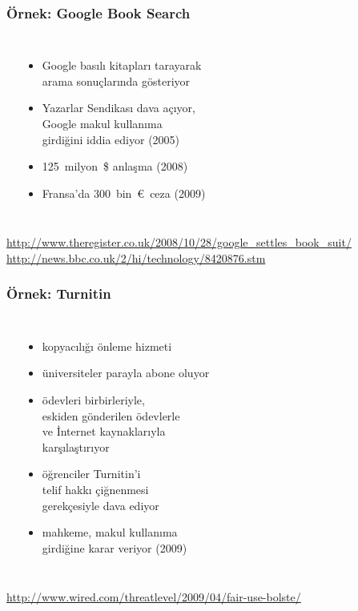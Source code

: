 \documentclass[dvipsnames]{beamer}
\theoremstyle{plain}
\begin{document}
\begin{frame}
  \frametitle{Örnek: Google Book Search}

  \begin{columns}
    \begin{center}
    \end{center}

    \begin{itemize}
      \item Google basılı kitapları tarayarak\\
        arama sonuçlarında gösteriyor
      \item Yazarlar Sendikası dava açıyor,\\
        Google makul kullanıma\\
        girdiğini iddia ediyor (2005)
      \item 125~milyon~\$ anlaşma (2008)
      \item Fransa'da 300~bin~\euro~ceza (2009)
    \end{itemize}
  \end{columns}

  \medskip
  \tiny{\url{http://www.theregister.co.uk/2008/10/28/google_settles_book_suit/}}\\
  \tiny{\url{http://news.bbc.co.uk/2/hi/technology/8420876.stm}}\\
\end{frame}

\begin{frame}
  \frametitle{Örnek: Turnitin}

  \begin{columns}
    \begin{center}
    \end{center}

    \begin{itemize}
      \item kopyacılığı önleme hizmeti
      \item üniversiteler parayla abone oluyor
      \item ödevleri birbirleriyle,\\
        eskiden gönderilen ödevlerle\\
        ve İnternet kaynaklarıyla\\
        karşılaştırıyor
      \item öğrenciler Turnitin'i\\
        telif hakkı çiğnenmesi\\
        gerekçesiyle dava ediyor
      \item mahkeme, makul kullanıma\\
        girdiğine karar veriyor (2009)
    \end{itemize}
  \end{columns}

  \medskip
  \tiny{\url{http://www.wired.com/threatlevel/2009/04/fair-use-bolste/}}\\
\end{frame}
\end{document}
